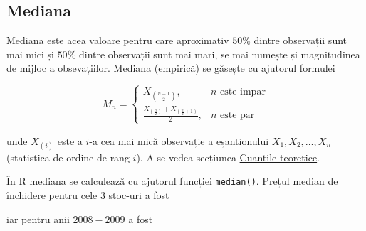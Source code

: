 \documentclass[]{article}
\newenvironment{Shaded}{\begin{snugshade}}{\end{snugshade}}
\newcommand{\KeywordTok}[1]{\textcolor[rgb]{0.13,0.29,0.53}{\textbf{#1}}}
\newcommand{\DecValTok}[1]{\textcolor[rgb]{0.00,0.00,0.81}{#1}}
\newcommand{\FloatTok}[1]{\textcolor[rgb]{0.00,0.00,0.81}{#1}}
\newcommand{\StringTok}[1]{\textcolor[rgb]{0.31,0.60,0.02}{#1}}
\newcommand{\OperatorTok}[1]{\textcolor[rgb]{0.81,0.36,0.00}{\textbf{#1}}}
\newcommand{\NormalTok}[1]{#1}
\begin{document}
\subsection{Mediana}\label{mediana}

Mediana este acea valoare pentru care aproximativ \(50\%\) dintre
observații sunt mai mici și \(50\%\) dintre observații sunt mai mari, se
mai numește și magnitudinea de mijloc a obsevațiilor. Mediana (empirică)
se găsește cu ajutorul formulei

\[
  M_n = \left\{\begin{array}{ll}
      X_{\left(\frac{n+1}{2}\right)}, & \text{$n$ este impar}\\
      \frac{X_{\left(\frac{n}{2}\right)} + X_{\left(\frac{n}{2}+1\right)}}{2}, & \text{$n$ este par}
  \end{array}\right.
\]

unde \(X_{(i)}\) este a \(i\)-a cea mai mică observație a eșantionului
\(X_1, X_2, \ldots, X_n\) (statistica de ordine de rang \(i\)). A se
vedea secțiunea \protect\hyperlink{sec:cuantile}{Cuantile teoretice}.

În R mediana se calculează cu ajutorul funcției \texttt{median()}.
Prețul median de închidere pentru cele 3 stoc-uri a fost

\begin{Shaded}
\end{Shaded}

iar pentru anii \(2008-2009\) a fost

\begin{Shaded}
\end{Shaded}
\end{document}

